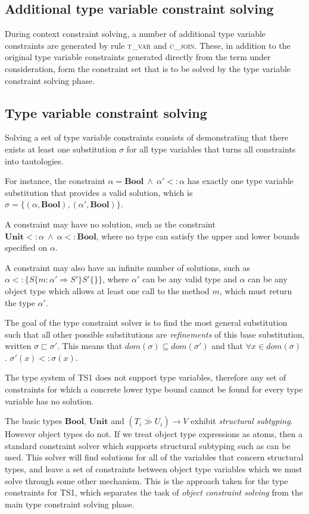 \documentclass[preprint]{sigplanconf}
\newcommand{\unitt}{\mathbf{Unit}}
\newcommand{\boolt}{\mathbf{Bool}}
\newcommand{\funt}[3]{(\overline{#1 \gg #2}) \rightarrow #3}
\newcommand{\cand}{\:\wedge\:}
\begin{document}
\subsection{Additional type variable constraint solving}

During context constraint solving, a number of additional type variable
constraints are generated by rule \textsc{t\_var} and \textsc{c\_join}.
These, in addition to the original type variable constraints generated
directly from the term under consideration, form the constraint set that
is to be solved by the type variable constraint solving phase.

\subsection{Type variable constraint solving}

Solving a set of type variable constraints consists of demonstrating that
there exists at least one substitution $\sigma$ for all type variables that 
turns all constraints into tautologies.

For instance, the constraint
$\alpha = \boolt \cand \alpha' <: \alpha$ has exactly one type variable 
substitution that provides a valid solution, which is 
$\sigma = \{ (\alpha, \boolt), (\alpha', \boolt) \}$. 

A constraint may have no solution, such as the constraint 
$\unitt <: \alpha \cand \alpha <: \boolt$, where no type can satisfy the upper
and lower bounds specified on $\alpha$.

A constraint may also have an infinite number of solutions, such as 
$\alpha <: \{ S \{ m : \alpha' \Rightarrow S' \} S' \{\} \}$, where
$\alpha'$ can be any valid type and $\alpha$ can be any object type which 
allows at least one call to the method $m$, which must return the type 
$\alpha'$.

The goal of the type constraint solver is to find the most general substitution
such that all other possible substitutions are {\it refinements} of this base
substitution, written $\sigma \sqsubset \sigma'$. This means that 
$dom(\sigma) \subseteq dom(\sigma')$ and that 
$\forall x \in dom(\sigma)$ . $\sigma'(x) <: \sigma(x)$.

The type system of TS1 does not support type variables, therefore any
set of constraints for which a concrete lower type bound cannot be found 
for every type variable has no solution.

The basic types $\boolt$, $\unitt$ and $\funt{T_i}{U_i}{V}$ exhibit 
{\it structural subtyping}. However object types do not. If we treat object 
type expressions as atoms,
then a standard constraint solver which supports structural subtyping such as 
\cite{Simonet2003} can be used. This solver will find solutions for all of the 
variables that concern structural types, and leave a set of constraints between 
object type variables which we must solve through some other mechanism. 
This is the approach taken for the type constraints for TS1, which separates 
the task of {\it object constraint solving} from the main type constraint 
solving phase.
\end{document}
